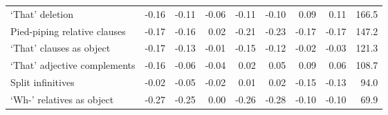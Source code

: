 \begin{table}[!t]
\begin{tabular*}{\linewidth}{@{\extracolsep{\fill}}lrrrrrrrr}
‘That’ deletion & -0.16 & -0.11 & -0.06 & -0.11 & -0.10 & 0.09 & 0.11 & 166.5 \\ 
Pied-piping relative clauses & -0.17 & -0.16 & 0.02 & -0.21 & -0.23 & -0.17 & -0.17 & 147.2 \\ 
‘That’ clauses as object & -0.17 & -0.13 & -0.01 & -0.15 & -0.12 & -0.02 & -0.03 & 121.3 \\ 
‘That’ adjective complements & -0.16 & -0.06 & -0.04 & 0.02 & 0.05 & 0.09 & 0.06 & 108.7 \\ 
Split infinitives & -0.02 & -0.05 & -0.02 & 0.01 & 0.02 & -0.15 & -0.13 & 94.0 \\ 
‘Wh-’ relatives as object & -0.27 & -0.25 & 0.00 & -0.26 & -0.28 & -0.10 & -0.10 & 69.9 \\ 
\bottomrule
\end{tabular*}
\end{table}

